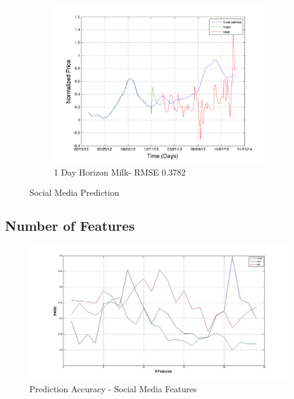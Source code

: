 \begin{figure}
       \hfill
       
        \begin{subfigure}[b]{0.5\textwidth}
                \includegraphics[width=\textwidth]{img/model/exp2/milk/pred_1}
                \caption{1 Day Horizon Milk- RMSE 0.3782}
                \label{fig:mouse}
        \end{subfigure}%
    
        \caption{Social Media Prediction}\label{fig:animals}
\end{figure}









\subsection{Number of Features}



\begin{figure}[H]
        \centering
         \includegraphics[width=1\textwidth ]{img/model/exp3/result}      
        \caption{Prediction Accuracy - Social Media Features }
        \label{fig:gnn_fuzz}
\end{figure}



